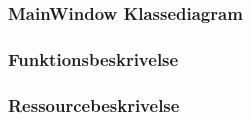 \documentclass[Softwaredesign/Softwaredesign_main.tex]{subfiles}
\begin{document}
\subsubsection{MainWindow Klassediagram \label{sec:GUI_klassediagram_doc}}

\subsubsection{Funktionsbeskrivelse\label{sec:GUI_funktionsbeskrivelse_doc}}

\subsubsection{Ressourcebeskrivelse\label{sec:Ressourcebeskrivelse_doc}}

\end{document}
